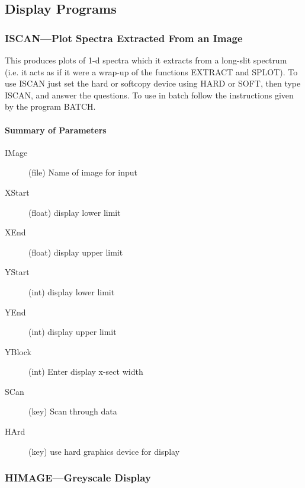 \subsection{\label{display_programs}Display Programs}

\subsubsection{ISCAN---Plot Spectra Extracted From an Image}

This produces plots of 1-d spectra which it extracts from a long-slit
spectrum (i.e. it acts as if it were a wrap-up of the  functions
EXTRACT and SPLOT).
To use ISCAN just set the hard or softcopy device using HARD or SOFT,
then type ISCAN, and answer the questions. To use in batch follow the
instructions given by the program BATCH.

\paragraph{Summary of Parameters}

\begin{description}
\item[IMage] (file) Name of image for input
\item[XStart] (float) display lower limit
\item[XEnd] (float) display upper limit
\item[YStart] (int) display lower limit
\item[YEnd] (int) display upper limit
\item[YBlock] (int) Enter display x-sect width
\item[SCan] (key) Scan through data
\item[HArd] (key) use hard graphics device for display
\end{description}

\subsubsection{HIMAGE---Greyscale Display}


